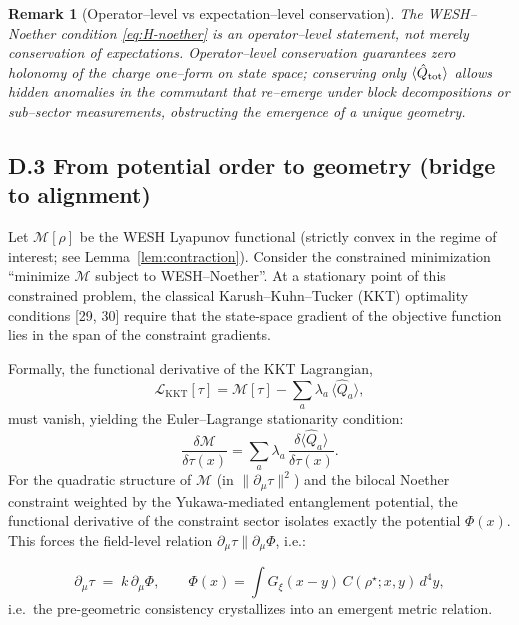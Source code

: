 \documentclass[12pt,a4paper]{article}
\newtheorem{remark}{Remark}[section]
\numberwithin{equation}{section}
\begin{document}
\begin{remark}[Operator–level vs expectation–level conservation]
The WESH–Noether condition \eqref{eq:H-noether} is an operator–level statement, not merely conservation of expectations. Operator–level conservation guarantees zero holonomy of the charge one–form on state space; conserving only $\langle\hat Q_{\rm tot}\rangle$ allows hidden anomalies in the commutant that re–emerge under block decompositions or sub–sector measurements, obstructing the emergence of a unique geometry.
\end{remark}

\vspace{0.3cm}
\subsection*{D.3 From potential order to geometry (bridge to alignment)}
\vspace{0.3cm}
Let $\mathcal M[\rho]$ be the WESH Lyapunov functional (strictly convex in the regime of interest; see Lemma~\ref{lem:contraction}). Consider the constrained minimization ``minimize $\mathcal M$ subject to WESH--Noether''. At a stationary point of this constrained problem, the classical Karush--Kuhn--Tucker (KKT) optimality conditions [29, 30] require that the state-space gradient of the objective function lies in the span of the constraint gradients.

Formally, the functional derivative of the KKT Lagrangian,
\[
\mathcal{L}_{\mathrm{KKT}}[\tau]
=\mathcal{M}[\tau]
-\sum_a \lambda_a\,\langle\hat Q_a\rangle,
\]
must vanish, yielding the Euler--Lagrange stationarity condition:
\[
\frac{\delta\mathcal{M}}{\delta\tau(x)}
=\sum_a\lambda_a\,\frac{\delta\langle\hat Q_a\rangle}{\delta\tau(x)}.
\]
For the quadratic structure of $\mathcal M$ (in $\|\partial_\mu\tau\|^2$) and the bilocal Noether constraint weighted by the Yukawa-mediated entanglement potential, the functional derivative of the constraint sector isolates exactly the potential $\Phi(x)$. This forces the field-level relation $\partial_\mu\tau \parallel \partial_\mu\Phi$, i.e.:

\begin{equation}
\partial_\mu \tau \;=\; k\,\partial_\mu \Phi,
\qquad
\Phi(x)=\!\int\! G_\xi(x-y)\,C(\rho^\star;x,y)\,d^4y,
\label{eq:alignmentG}
\end{equation}
i.e.\ the pre-geometric consistency crystallizes into an emergent metric relation.
\end{document}
